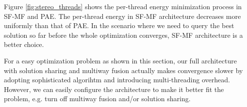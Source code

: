 Figure \ref{fig:stereo_threads} shows the per-thread energy
minimization process in SF-MF and PAE. The per-thread energy in SF-MF
architecture decreases more uniformly than that of PAE. In the
scenario where we need to query the best solution so far before the
whole optimization converges, SF-MF architecture is a better choice.

For a easy optimization problem as shown in this section, our full
architecture with solution sharing and multiway fusion actually makes
convergence slower by adopting sophisticated algorihtm and introducing
multi-threading overhead. However, we can easily configure the
architecture to make it better fit the problem, e.g. turn off multiway
fusion and/or solution sharing.

